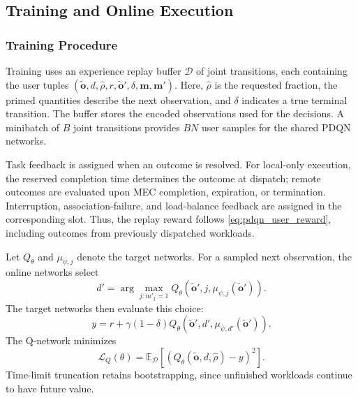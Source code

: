 \documentclass[journal]{IEEEtran}
\begin{document}
\subsection{Training and Online Execution}
\label{subsec:training_execution}

\subsubsection{Training Procedure}

Training uses an experience replay buffer $\mathcal{D}$
of joint transitions, each containing the user tuples
$(\widetilde{\mathbf{o}},d,\widehat{\rho},r,
\widetilde{\mathbf{o}}',\delta,\mathbf{m},\mathbf{m}')$.
Here, $\widehat{\rho}$ is the requested fraction,
the primed quantities describe the next observation,
and $\delta$ indicates a true terminal transition.
The buffer stores the encoded observations used for
the decisions. A minibatch of $B$ joint transitions
provides $BN$ user samples for the shared PDQN networks.

Task feedback is assigned when an outcome is resolved.
For local-only execution, the reserved completion time
determines the outcome at dispatch; remote outcomes
are evaluated upon MEC completion, expiration, or
termination. Interruption, association-failure, and
load-balance feedback are assigned in the corresponding
slot. Thus, the replay reward follows
\eqref{eq:pdqn_user_reward}, including outcomes from
previously dispatched workloads.

Let $Q_{\bar{\theta}}$ and $\mu_{\bar{\psi},j}$
denote the target networks. For a sampled next observation,
the online networks select
\begin{equation}
d'
=
\arg\max_{j:m'_j=1}
Q_\theta\left(
\widetilde{\mathbf{o}}',j,
\mu_{\psi,j}(\widetilde{\mathbf{o}}')
\right).
\label{eq:pdqn_next_action}
\end{equation}
The target networks then evaluate this choice:
\begin{equation}
y
=
r+\gamma(1-\delta)
Q_{\bar{\theta}}\left(
\widetilde{\mathbf{o}}',d',
\mu_{\bar{\psi},d'}(\widetilde{\mathbf{o}}')
\right).
\label{eq:pdqn_td_target}
\end{equation}
The Q-network minimizes
\begin{equation}
\mathcal{L}_Q(\theta)
=
\mathbb{E}_{\mathcal{D}}
\left[
\left(
Q_\theta(\widetilde{\mathbf{o}},d,\widehat{\rho})-y
\right)^2
\right].
\label{eq:pdqn_q_loss}
\end{equation}
Time-limit truncation retains bootstrapping, since
unfinished workloads continue to have future value.
\end{document}

